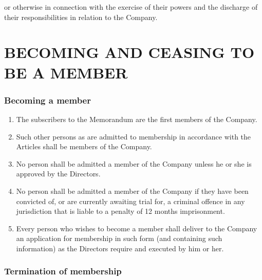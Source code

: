 \documentclass[a4paper,12pt]{article}
\begin{document}
or otherwise in connection with the exercise of their powers and the discharge of their responsibilities in relation to the Company.

\part*{BECOMING AND CEASING TO BE A MEMBER}

\section{Becoming a member}

\begin{enumerate}
  \item The subscribers to the Memorandum are the first members of the Company. %
  \item Such other persons as are admitted to membership in accordance with the Articles shall be members of the Company. %
  \item No person shall be admitted a member of the Company unless he or she is approved by the Directors. %
  \item No person shall be admitted a member of the Company if they have been convicted of, or are currently awaiting trial for, a criminal offence in any jurisdiction that is liable to a penalty of 12 months imprisonment. %
  \item Every person who wishes to become a member shall deliver to the Company an application for membership in such form (and containing such information) as the Directors require and executed by him or her. %
\end{enumerate}

\section{Termination of membership}
\end{document}
